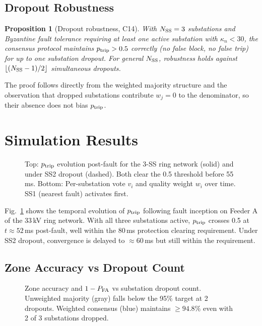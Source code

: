 \documentclass[journal]{IEEEtran}
\newcommand{\kappan}{\kappa_{n}}
\newcommand{\ptrip}{p_{\rm trip}}
\newcommand{\NSS}{N_{\rm SS}}
\newtheorem{proposition}[theorem]{Proposition}
\begin{document}
\subsection{Dropout Robustness}

\begin{proposition}[Dropout robustness, C14]
\label{prop:dropout}
With $\NSS = 3$ substations and Byzantine fault tolerance requiring
at least one active substation with $\kappan < 30$, the consensus
protocol maintains $\ptrip > 0.5$ correctly (no false block, no
false trip) for up to one substation dropout.  For general $\NSS$,
robustness holds against $\lfloor (\NSS-1)/2 \rfloor$ simultaneous
dropouts.
\end{proposition}

The proof follows directly from the weighted majority structure and
the observation that dropped substations contribute $w_j = 0$ to
the denominator, so their absence does not bias $\ptrip$.

\section{Simulation Results}
\label{sec:simulation}

\begin{figure}[!t]
\centering
\resizebox{\columnwidth}{!}{%
%
}
\caption{Top: $\ptrip$ evolution post-fault for the 3-SS ring
  network (solid) and under SS2 dropout (dashed).  Both clear the
  0.5 threshold before 55\,ms.
  Bottom: Per-substation vote $v_i$ and quality weight $w_i$
  over time.  SS1 (nearest fault) activates first.}
\label{fig:consensus_convergence}
\end{figure}

Fig.~\ref{fig:consensus_convergence} shows the temporal evolution
of $\ptrip$ following fault inception on Feeder A of the 33\,kV
ring network.  With all three substations active, $\ptrip$ crosses
0.5 at $t \approx 52$\,ms post-fault, well within the 80\,ms
protection clearing requirement.  Under SS2 dropout, convergence
is delayed to $\approx 60$\,ms but still within the requirement.

\subsection{Zone Accuracy vs Dropout Count}

\begin{figure}[!t]
\centering
\resizebox{\columnwidth}{!}{%
%
}
\caption{Zone accuracy and $1-P_{\rm FA}$ vs substation dropout
  count.  Unweighted majority (gray) falls below the 95\% target
  at 2 dropouts.  Weighted consensus (blue) maintains $\geq 94.8\%$
  even with 2 of 3 substations dropped.}
\label{fig:robustness_dropout}
\end{figure}
\end{document}
